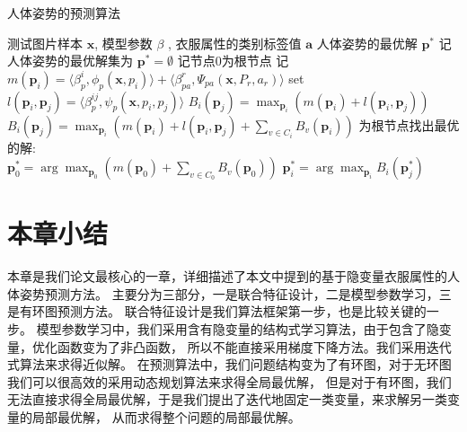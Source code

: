 \begin{algorithm}
\caption{人体姿势的预测算法}
\begin{algorithmic}[1]
    \REQUIRE 测试图片样本 $\mathbf{x}$, 模型参数 $\beta$ ,  衣服属性的类别标签值 $\mathbf{a}$
    \ENSURE 人体姿势的最优解 $\mathbf{p^*}$
    \STATE 记人体姿势的最优解集为 $\mathbf{p^*} = \emptyset$
    \STATE 记节点0为根节点
        \STATE 记 $m(\mathbf{p}_i) = \langle \beta_p^i, \phi_p(\mathbf{x}, p_i) \rangle + \langle \beta_{pa}^r, \Psi_{pa}(\mathbf{x}, P_r, a_r) \rangle$
    \ENDFOR
        \STATE set $l(\mathbf{p}_i, \mathbf{p}_j) = \langle \beta_p^{ij}, \psi_p(\mathbf{x}, p_i, p_j) \rangle$
            \STATE $B_i(\mathbf{p}_j) = \max_{\mathbf{p}_i} (m(\mathbf{p}_i) + l(\mathbf{p}_i, \mathbf{p}_j) )$
        \ELSE
            \STATE $B_i(\mathbf{p}_j) = \max_{\mathbf{p}_i} (m(\mathbf{p}_i) + l(\mathbf{p}_i, \mathbf{p}_j) + \sum_{v \in C_i} B_v(\mathbf{p}_i) )$
        \ENDIF
    \ENDFOR
    \STATE 为根节点找出最优的解: \\
        $\mathbf{p}_0^* = \arg \max_{\mathbf{p}_0} ( m(\mathbf{p}_0) + \sum_{v \in C_0} B_v(\mathbf{p}_0) )$
        \STATE $\mathbf{p}_i^* = \arg \max_{\mathbf{p}_i} B_i(\mathbf{p}_j^*)$
    \ENDFOR
\end{algorithmic}
\label{alg:ps}
\end{algorithm}

\section{本章小结}
本章是我们论文最核心的一章，详细描述了本文中提到的基于隐变量衣服属性的人体姿势预测方法。
主要分为三部分，一是联合特征设计，二是模型参数学习，三是有环图预测方法。
联合特征设计是我们算法框架第一步，也是比较关键的一步。
模型参数学习中，我们采用含有隐变量的结构式学习算法，由于包含了隐变量，优化函数变为了非凸函数，
所以不能直接采用梯度下降方法。我们采用迭代式算法来求得近似解。
在预测算法中，我们问题结构变为了有环图，对于无环图我们可以很高效的采用动态规划算法来求得全局最优解，
但是对于有环图，我们无法直接求得全局最优解，于是我们提出了迭代地固定一类变量，来求解另一类变量的局部最优解，
从而求得整个问题的局部最优解。

